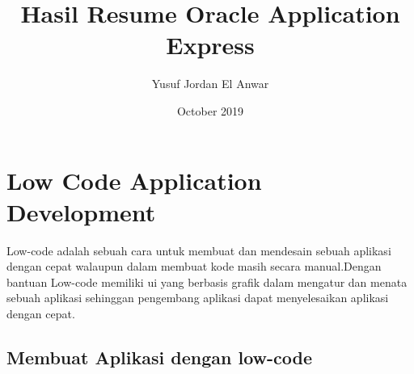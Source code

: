 \documentclass[12pt, times new roman]{article}
\title{Hasil Resume Oracle Application Express}
\author{Yusuf Jordan El Anwar}
\date{October 2019}
\begin{document}
\maketitle
\section{Low Code Application Development}
Low-code adalah sebuah cara untuk membuat dan mendesain sebuah aplikasi dengan cepat walaupun dalam membuat kode masih secara manual.Dengan bantuan Low-code memiliki ui yang berbasis grafik dalam mengatur dan menata sebuah aplikasi sehinggan pengembang aplikasi dapat menyelesaikan aplikasi dengan cepat.
\subsection{Membuat Aplikasi dengan low-code}
\end{document}

